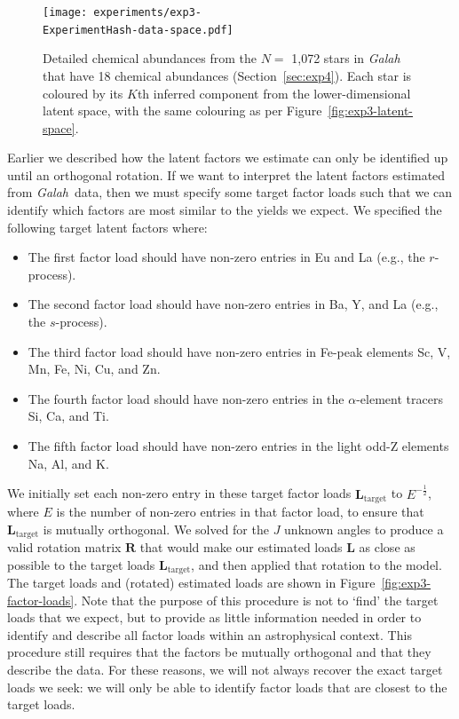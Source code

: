 \documentclass[twocolumn]{aastex62}
\newcommand{\project}[1]{\textsl{#1}}
\newcommand{\Galah}{\project{Galah}}
\newcommand{\vect}[1]{\boldsymbol{\mathbf{#1}}}
\renewcommand{\vec}[1]{\vect{#1}}
\newcommand{\factorloads}{\textbf{L}}
\newcommand{\NumLatentFactors}{J}
\newcommand{\ExperimentHash}{89dab}
\begin{document}
\begin{figure}
	\texttt{[image: experiments/exp3-\\ExperimentHash-data-space.pdf]}
	\caption{Detailed chemical abundances from the $N =$ 1,072 stars in \Galah\ \citep{Buder:2018} that have 18 chemical abundances (Section~\ref{sec:exp4}). Each star is coloured by its $K$th inferred component from the lower-dimensional latent space, with the same colouring as per Figure~\ref{fig:exp3-latent-space}.}
    \label{fig:exp3-data-space}
\end{figure}

Earlier we described how the latent factors we estimate can only be identified up until an orthogonal rotation. If we want to interpret the latent factors estimated from \Galah\ data, then we must specify
some target factor loads such that we can identify which factors are most similar to the yields we expect.
We specified the following target latent factors where:
\begin{itemize}
	\item The first factor load should have non-zero entries in Eu and La (e.g., the $r$-process).
	\item The second factor load should have non-zero entries in Ba, Y, and La (e.g., the $s$-process).
	\item The third factor load should have non-zero entries in Fe-peak elements Sc, V, Mn, Fe, Ni, Cu, and Zn.
	\item The fourth factor load should have non-zero entries in the $\alpha$-element tracers Si, Ca, and Ti.
	\item The fifth factor load should have non-zero entries in the light odd-Z elements Na, Al, and K.
\end{itemize}

We initially set each non-zero entry in these target factor loads $\factorloads_\textrm{target}$ to $E^{-\frac{1}{2}}$, where $E$ is the number of non-zero entries in that factor load, to ensure that $\factorloads_\textrm{target}$ is mutually orthogonal.
We solved for the $\NumLatentFactors$ unknown angles to produce a valid rotation matrix $\vec{R}$ that would make our estimated loads $\factorloads$ as close as possible to the target loads $\factorloads_\textrm{target}$, and then applied that rotation to the model. The target loads and (rotated) estimated loads are shown in Figure~\ref{fig:exp3-factor-loads}. Note that the purpose of this procedure is not to `find' the target loads that we expect, but to provide as little information needed in order to identify and describe all factor loads within an astrophysical context. This procedure still requires that the factors be mutually orthogonal and that they describe the data. For these reasons, we will not always recover the exact target loads we seek: we will only be able to identify factor loads that are closest to the target loads.
\end{document}
